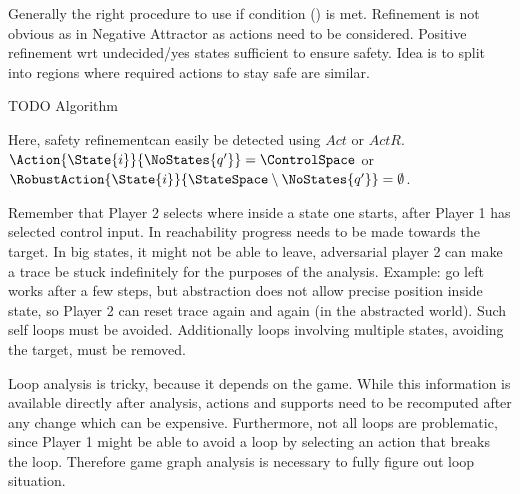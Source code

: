     Generally the right procedure to use if condition () is met.
    Refinement is not obvious as in Negative Attractor as actions need to be considered.
    Positive refinement wrt undecided/yes states sufficient to ensure safety.
    Idea is to split into regions where required actions to stay safe are similar.

    TODO Algorithm

    Here, safety refinementcan easily be detected using $Act$ or $ActR$.
    $\Action{\State{i}}{\NoStates{q'}} = \ControlSpace$ or $\RobustAction{\State{i}}{\StateSpace \setminus \NoStates{q'}} = \emptyset$.

\stopsubsection


    \startalgorithmic[numbering=no,margin=0em]
    \stopalgorithmic
    \startalgorithmic
        \ELSE
        \ENDIF
    \stopalgorithmic
\stopbuffer

\startsubsection[title={Loops},reference={sec:refinement-negative-loops}]


    Remember that Player 2 selects where inside a state one starts, after Player 1 has selected control input.
    In reachability progress needs to be made towards the target.
    In big states, it might not be able to leave, adversarial player 2 can make a trace be stuck indefinitely for the purposes of the analysis.
    Example: go left works after a few steps, but abstraction does not allow precise position inside state, so Player 2 can reset trace again and again (in the abstracted world).
    Such self loops must be avoided.
    Additionally loops involving multiple states, avoiding the target, must be removed.

    Loop analysis is tricky, because it depends on the game.
    While this information is available directly after analysis, actions and supports need to be recomputed after any change which can be expensive.
    Furthermore, not all loops are problematic, since Player 1 might be able to avoid a loop by selecting an action that breaks the loop.
    Therefore game graph analysis is necessary to fully figure out loop situation.

